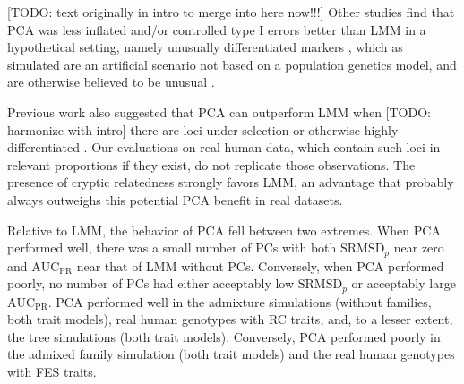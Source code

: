 \documentclass[11pt]{article}
\newcommand{\rmsd}{\text{SRMSD}_p}
\newcommand{\auc}{\text{AUC}_\text{PR}}
\begin{document}
[TODO: text originally in intro to merge into here now!!!]
Other studies find that PCA was less inflated and/or controlled type I errors better than LMM in a hypothetical setting, namely unusually differentiated markers \citep{price_new_2010, wu_comparison_2011}, which as simulated are an artificial scenario not based on a population genetics model, and are otherwise believed to be unusual \citep{sul_mixed_2013, price_response_2013}.

Previous work also suggested that PCA can outperform LMM when [TODO: harmonize with intro] there are loci under selection or otherwise highly differentiated \citep{price_new_2010, wu_comparison_2011, yang_advantages_2014}.
Our evaluations on real human data, which contain such loci in relevant proportions if they exist, do not replicate those observations.
The presence of cryptic relatedness strongly favors LMM, an advantage that probably always outweighs this potential PCA benefit in real datasets.

Relative to LMM, the behavior of PCA fell between two extremes.
When PCA performed well, there was a small number of PCs with both $\rmsd$ near zero and $\auc$ near that of LMM without PCs.
Conversely, when PCA performed poorly, no number of PCs had either acceptably low $\rmsd$ or acceptably large $\auc$.
PCA performed well in the admixture simulations (without families, both trait models), real human genotypes with RC traits, and, to a lesser extent, the tree simulations (both trait models).
Conversely, PCA performed poorly in the admixed family simulation (both trait models) and the real human genotypes with FES traits.
\end{document}
